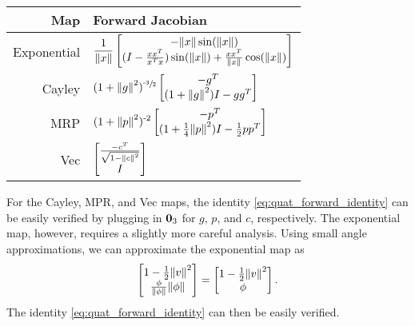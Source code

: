 \documentclass[../root.tex]{subfiles}
\begin{document}
\begin{table}[h!]
    \centering
    \begin{tabular}{r l}
        Map & Forward Jacobian \\
        \midrule
        Exponential 
            & $ \displaystyle \frac{1}{\norm{x}} \begin{bmatrix}
                -\norm{x} \sin(\norm{x}) \\
                (I - \frac{x x^T}{x^T x}) \sin(\norm{x}) + \frac{x x^T}{\norm{x}} \cos(\norm{x})
            \end{bmatrix}  $ \\
        Cayley 
            & $ \displaystyle (1+\norm{g}^2)^{\sfrac{\text{-}3}{2}} \begin{bmatrix} -g^T \\ (1+\norm{g}^2)I - g g^T \end{bmatrix} $ \\
        MRP 
            & $ \displaystyle (1 + \norm{p}^2)^{\text{-}2} \begin{bmatrix} -p^T \\ (1+\frac{1}{4} \norm{p}^2) I - \frac{1}{2} p p^T \end{bmatrix} $ \\
        Vec 
            & $ \displaystyle \begin{bmatrix} \frac{-c^T}{\sqrt{1 - \norm{c}^2}} \\ I \end{bmatrix} $
    \end{tabular}
\end{table}
For the Cayley, MPR, and Vec maps, the identity \eqref{eq:quat_forward_identity} can 
be easily verified by plugging in $\mathbf{0}_3$ for $g$, $p$, and $c$, respectively.
The exponential map, however, requires a slightly more careful analysis. Using small
angle approximations, we can approximate the exponential map as 
\begin{equation} \label{eq:expm_approx}
    \begin{bmatrix}
        1 - \frac{1}{2} \norm{v}^2 \\ \frac{\phi}{\norm{\phi}} \norm{\phi}
    \end{bmatrix} = \begin{bmatrix}
        1 - \frac{1}{2} \norm{v}^2 \\ \phi
    \end{bmatrix}.
\end{equation}
The identity \eqref{eq:quat_forward_identity} can then be easily verified.
\end{document}
